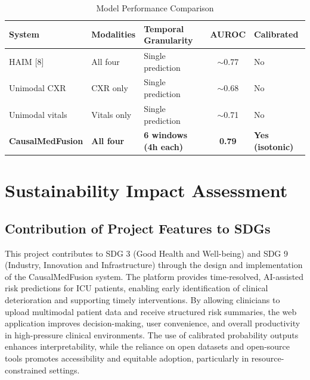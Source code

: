\documentclass{fisatprojectfinal}
\begin{document}
\begin{table}[ht]
    \centering
    \small %
    \label{tab:system_comparison}
    \begin{tabularx}{\textwidth}{l l X c l}
        \toprule
        \textbf{System} & \textbf{Modalities} & \textbf{Temporal Granularity} & \textbf{AUROC} & \textbf{Calibrated} \\
        \midrule
        HAIM [8] & All four & Single prediction & $\sim$0.77 & No \\
        \addlinespace
        Unimodal CXR & CXR only & Single prediction & $\sim$0.68 & No \\
        \addlinespace
        Unimodal vitals & Vitals only & Single prediction & $\sim$0.71 & No \\
        \addlinespace
        \textbf{CausalMedFusion} & \textbf{All four} & \textbf{6 windows (4h each)} & \textbf{0.79} & \textbf{Yes (isotonic)} \\
        \bottomrule
    \end{tabularx}
    \caption{Model Performance Comparison}
\end{table}

\section{Sustainability Impact Assessment}

\subsection{Contribution of Project Features to SDGs}
This project contributes to SDG 3 (Good Health and Well-being) and SDG 9 (Industry, Innovation and Infrastructure) through the design and implementation of the CausalMedFusion system. The platform provides time-resolved, AI-assisted risk predictions for ICU patients, enabling early identification of clinical deterioration and supporting timely interventions. By allowing clinicians to upload multimodal patient data and receive structured risk summaries, the web application improves decision-making, user convenience, and overall productivity in high-pressure clinical environments. The use of calibrated probability outputs enhances interpretability, while the reliance on open datasets and open-source tools promotes accessibility and equitable adoption, particularly in resource-constrained settings. \\
\end{document}
